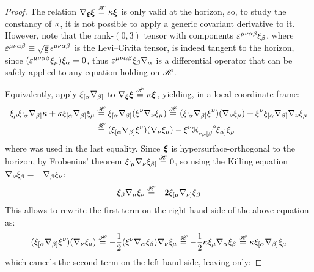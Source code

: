 \begin{proofbox}
  \begin{proof}
    The relation $ \nabla_{\boldsymbol{\xi}} \boldsymbol{\xi} \overset{\mathscr{H}}{=} \kappa \boldsymbol{\xi} $ is only valid at the horizon, so, to study the constancy of $ \kappa $, it is not possible to apply a generic covariant derivative to it. However, note that the rank-$ (0,3) $ tensor with components $ \varepsilon^{\mu \nu \alpha \beta} \xi_\beta $, where $ \varepsilon^{\mu \nu \alpha \beta} \equiv \sqrt{\mathrm{g}} \, \epsilon^{\mu \nu \alpha \beta} $ is the Levi--Civita tensor, is indeed tangent to the horizon, since $ (\varepsilon^{\mu \nu \alpha \beta} \xi_\mu) \xi_\alpha = 0 $, thus $ \varepsilon^{\mu \nu \alpha \beta} \xi_\beta \nabla_\alpha $ is a differential operator that can be safely applied to any equation holding on $ \mathscr{H} $.

    Equivalently, apply $ \xi_{[\alpha} \nabla_{\beta]} $ to $ \nabla_{\boldsymbol{\xi}} \boldsymbol{\xi} \overset{\mathscr{H}}{=} \kappa \boldsymbol{\xi} $, yielding, in a local coordinate frame:
    \begin{equation*}
      \begin{split}
        \xi_\mu \xi_{[\alpha} \na_{\beta]} \sg + \sg \xi_{[\alpha} \na_{\beta]} \xi_\mu
        & \heq \xi_{[\alpha} \na_{\beta]} (\xi^\nu \na_\nu \xi_\mu) \heq (\xi_{[\alpha} \na_{\beta]} \xi^\nu) (\na_\nu \xi_\mu) + \xi^\nu \xi_{[\alpha} \na_{\beta]} \na_\nu \xi_\mu \\
        & \heq (\xi_{[\alpha} \na_{\beta]} \xi^\nu) (\na_\nu \xi_\mu) - \xi^\nu \tensor{\rr}{_{\nu \mu [\beta}^\rho} \xi_{\alpha]} \xi_\rho
      \end{split}
    \end{equation*}
    where  was used in the last equality. Since $ \boldsymbol{\xi} $ is hypersurface-orthogonal to the horizon, by Frobenius' theorem $ \xi_{[\mu} \nabla_\nu \xi_{\beta]} \overset{\mathscr{H}}{=} 0 $, so using the Killing equation $ \nabla_\nu \xi_\beta = - \nabla_\beta \xi_\nu $:
    \begin{equation}
      \xi_\beta \nabla_\mu \xi_\nu \overset{\mathscr{H}}{=} - 2 \xi_{[\mu} \nabla_{\nu]} \xi_\beta
      \label{eq:sg-aux}
    \end{equation}
    This allows to rewrite the first term on the right-hand side of the above equation as:
    \begin{equation*}
      (\xi_{[\alpha} \nabla_{\beta]} \xi^\nu) (\nabla_\nu \xi_\mu) \overset{\mathscr{H}}{=} - \frac{1}{2} (\xi^\nu \nabla_\alpha \xi_\beta) \nabla_\nu \xi_\mu \overset{\mathscr{H}}{=} - \frac{1}{2} \kappa \xi_\mu \nabla_\alpha \xi_\beta \overset{\mathscr{H}}{=} \kappa \xi_{[\alpha} \nabla_{\beta]} \xi_\mu
    \end{equation*}
    which cancels the second term on the left-hand side, leaving only:

\end{proof}
\end{proofbox}
